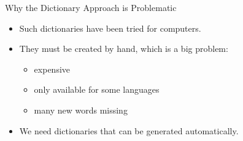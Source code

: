 \documentclass[professionalfonts, xcolor={usenames,svgnames,x11names,table}]{beamer}
\begin{document}
\begin{frame}{Why the Dictionary Approach is Problematic}
    \begin{itemize}
        \item Such dictionaries have been tried for computers.\\
        \item They must be created by hand, which is a big problem:
            \begin{itemize}
                \item expensive
                \item only available for some languages
                \item many new words missing
            \end{itemize}
        \item We need dictionaries that can be generated automatically.
    \end{itemize}
\end{frame}
\end{document}
